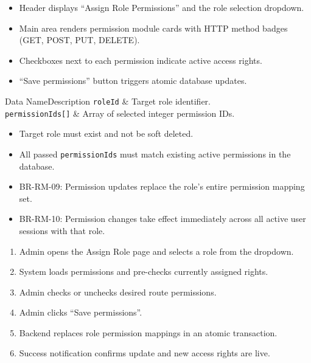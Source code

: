\begin{itemize}[leftmargin=1.6em,topsep=3pt,itemsep=2pt,parsep=0pt,label=$\bullet$]
    \item Header displays ``Assign Role Permissions'' and the role selection dropdown.
    \item Main area renders permission module cards with HTTP method badges (GET, POST, PUT, DELETE).
    \item Checkboxes next to each permission indicate active access rights.
    \item ``Save permissions'' button triggers atomic database updates.
\end{itemize}


\begin{specdatatable}{Data Name}{Description}
\texttt{roleId} & Target role identifier.\\ \hline
\texttt{permissionIds[]} & Array of selected integer permission IDs.\\ \hline
\end{specdatatable}

\begin{itemize}[leftmargin=1.6em,topsep=3pt,itemsep=2pt,parsep=0pt,label=$\bullet$]
    \item Target role must exist and not be soft deleted.
    \item All passed \texttt{permissionIds} must match existing active permissions in the database.
\end{itemize}

\begin{itemize}[leftmargin=1.6em,topsep=3pt,itemsep=2pt,parsep=0pt,label=$\bullet$]\brrulelist
    \item BR-RM-09: Permission updates replace the role's entire permission mapping set.
    \item BR-RM-10: Permission changes take effect immediately across all active user sessions with that role.
\end{itemize}

\begin{enumerate}[leftmargin=1.8em,topsep=3pt,itemsep=2pt,parsep=0pt]
    \item Admin opens the Assign Role page and selects a role from the dropdown.
    \item System loads permissions and pre-checks currently assigned rights.
    \item Admin checks or unchecks desired route permissions.
    \item Admin clicks ``Save permissions''.
    \item Backend replaces role permission mappings in an atomic transaction.
    \item Success notification confirms update and new access rights are live.
\end{enumerate}

